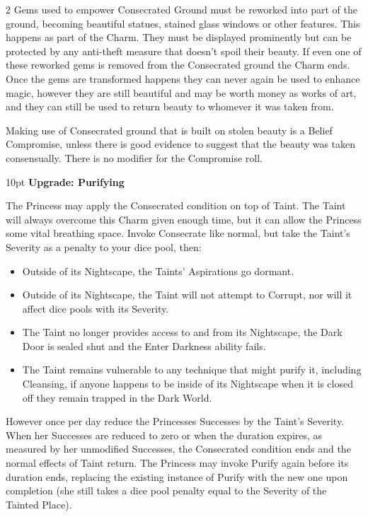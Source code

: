 \begin{multicols}{2}
Gems used to empower Consecrated Ground must be reworked into part of the ground, becoming beautiful statues, stained glass windows or other features. This happens as part of the Charm. They must be displayed prominently but can be protected by any anti-theft measure that doesn’t spoil their beauty. If even one of these reworked gems is removed from the Consecrated ground the Charm ends. Once the gems are transformed happens they can never again be used to enhance magic, however they are still beautiful and may be worth money as works of art, and they can still be used to return beauty to whomever it was taken from.

Making use of Consecrated ground that is built on stolen beauty is a Belief Compromise, unless there is good evidence to suggest that the beauty was taken consensually. There is no modifier for the Compromise roll.

\begin{myindentpar}{10pt} \textbf{Upgrade: Purifying}

The Princess may apply the Consecrated condition on top of Taint. The Taint will always overcome this Charm given enough time, but it can allow the Princess some vital breathing space. Invoke Consecrate like normal, but take the Taint’s Severity as a penalty to your dice pool, then:

   \begin{itemize} \item Outside of its Nightscape, the Taints’ Aspirations go dormant. 
    \item Outside of its Nightscape, the Taint will not attempt to Corrupt, nor will it affect dice pools with its Severity.
    \item The Taint no longer provides access to and from its Nightscape, the Dark Door is sealed shut and the Enter Darkness ability fails.
	\item The Taint remains vulnerable to any technique that might purify it, including Cleansing, if anyone happens to be inside of its Nightscape when it is closed off they remain trapped in the Dark World. \end{itemize}

However once per day reduce the Princesses Successes by the Taint’s Severity. When her Successes are reduced to zero or when the duration expires, as measured by her unmodified Successes, the Consecrated condition ends and the normal effects of Taint return. The Princess may invoke Purify again before its duration ends, replacing the existing instance of Purify with the new one upon completion (she still takes a dice pool penalty equal to the Severity of the Tainted Place).


\end{myindentpar}
\end{multicols}
